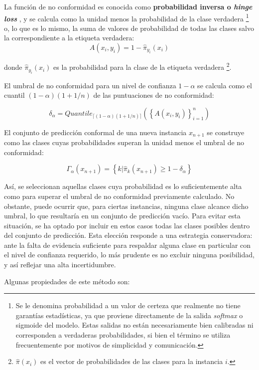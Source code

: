 La función de no conformidad es conocida como \textbf{probabilidad inversa o \textit{hinge loss}} \cite{johansson2017}, y se calcula como la unidad menos la probabilidad de la clase verdadera%
\footnote{
    Se le denomina probabilidad a un valor de certeza que realmente no tiene garantías estadísticas, ya que proviene directamente de la salida \textit{softmax} o sigmoide del modelo. Estas salidas no están necesariamente bien calibradas ni corresponden a verdaderas probabilidades, si bien el término se utiliza frecuentemente por motivos de simplicidad y comunicación.
}
o, lo que es lo mismo, la suma de valores de probabilidad de todas las clases salvo la correspondiente a la etiqueta verdadera:
$$
A(x_i,y_i) = 1- \hat{\pi}_{y_i}(x_i)
$$

donde $\hat{\pi}_{y_i}(x_i)$ es la probabilidad para la clase de la etiqueta verdadera%
\footnote{
    $\hat{\pi}(x_i)$ es el vector de probabilidades de las clases para la instancia $i$.
}.


El umbral de no conformidad para un nivel de confianza $1-\alpha$ se calcula como el cuantil 
$(1-\alpha)(1+1/n)$ de las puntuaciones de no conformidad:

$$
\delta_\alpha = Quantile_{ \lceil  (1-\alpha) (1 + 1/n)  \rceil } ( \left\{ A(x_i,y_i) \right\}_{i=1}^n)
$$

El conjunto de predicción conformal de una nueva instancia $x_{n+1}$ se construye como las clases cuyas probabilidades superan la unidad menos el umbral de no conformidad:

$$
\Gamma_\alpha(x_{n+1}) = \left\{ k | \hat{\pi}_k(x_{n+1}) \ge 1-\delta_\alpha \right\} 
$$

Así, se seleccionan aquellas clases cuya probabilidad es lo suficientemente alta como para superar el umbral de no conformidad previamente calculado. No obstante, puede ocurrir que, para ciertas instancias, ninguna clase alcance dicho umbral, lo que resultaría en un conjunto de predicción vacío. Para evitar esta situación, se ha optado por incluir en estos casos todas las clases posibles dentro del conjunto de predicción. Esta elección responde a una estrategia conservadora: ante la falta de evidencia suficiente para respaldar alguna clase en particular con el nivel de confianza requerido, lo más prudente es no excluir ninguna posibilidad, y así reflejar una alta incertidumbre. 

Algunas propiedades de este método son:

